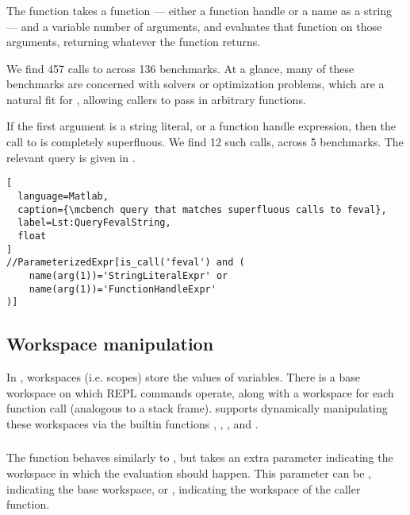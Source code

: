 \subsubsection{}

The  function takes a function --- either a function handle or a
name as a string --- and a variable number of arguments, and evaluates that
function on those arguments, returning whatever the function returns.

We find 457 calls to  across 136 benchmarks. At a glance, many of
these benchmarks are concerned with solvers or optimization problems, which are
a natural fit for , allowing callers to pass in arbitrary
functions.

If the first argument is a string literal, or a function handle expression,
then the call to  is completely superfluous. We find 12 such calls,
across 5 benchmarks. The relevant query is given in
.

\begin{lstlisting}[
  language=Matlab,
  caption={\mcbench query that matches superfluous calls to feval},
  label=Lst:QueryFevalString,
  float
]
//ParameterizedExpr[is_call('feval') and (
    name(arg(1))='StringLiteralExpr' or
    name(arg(1))='FunctionHandleExpr'
)]
\end{lstlisting}

\subsection{Workspace manipulation}

In \matlab, workspaces (i.e. scopes) store the values of variables. There is a
base workspace on which REPL commands operate, along with a workspace for each
function call (analogous to a stack frame). \matlab supports dynamically
manipulating these workspaces via the builtin functions ,
, , and .

\subsubsection{}

The  function behaves similarly to , but takes an extra
parameter indicating the workspace in which the evaluation should happen. This
parameter can be , indicating the \matlab base workspace, or
, indicating the workspace of the caller function.

